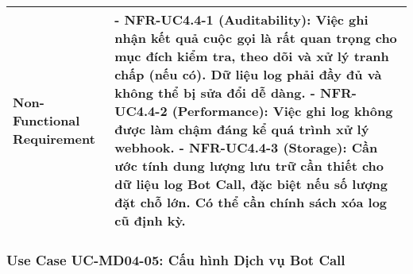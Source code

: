 \begin{longtable}{|m{4cm}|p{11cm}|}
\hline
Non-Functional Requirement & - \textbf{NFR-UC4.4-1 (Auditability):} Việc ghi nhận kết quả cuộc gọi là rất quan trọng cho mục đích kiểm tra, theo dõi và xử lý tranh chấp (nếu có). Dữ liệu log phải đầy đủ và không thể bị sửa đổi dễ dàng. \newline - \textbf{NFR-UC4.4-2 (Performance):} Việc ghi log không được làm chậm đáng kể quá trình xử lý webhook. \newline - \textbf{NFR-UC4.4-3 (Storage):} Cần ước tính dung lượng lưu trữ cần thiết cho dữ liệu log Bot Call, đặc biệt nếu số lượng đặt chỗ lớn. Có thể cần chính sách xóa log cũ định kỳ. \\
\hline
\end{longtable}

\subsubsection{Use Case UC-MD04-05: Cấu hình Dịch vụ Bot Call}

